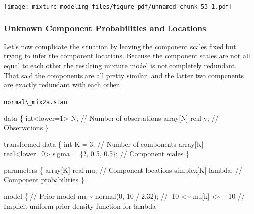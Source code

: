 \documentclass[
  letterpaper,
  DIV=11,
  numbers=noendperiod]{scrartcl}
\newenvironment{Shaded}{\begin{snugshade}}{\end{snugshade}}
\newcommand{\CommentTok}[1]{\textcolor[rgb]{0.37,0.37,0.37}{#1}}
\newcommand{\DataTypeTok}[1]{\textcolor[rgb]{0.68,0.00,0.00}{#1}}
\newcommand{\DecValTok}[1]{\textcolor[rgb]{0.68,0.00,0.00}{#1}}
\newcommand{\FloatTok}[1]{\textcolor[rgb]{0.68,0.00,0.00}{#1}}
\newcommand{\KeywordTok}[1]{\textcolor[rgb]{0.00,0.23,0.31}{#1}}
\newcommand{\NormalTok}[1]{\textcolor[rgb]{0.00,0.23,0.31}{#1}}
\begin{document}
\texttt{[image: mixture\_modeling\_files/figure-pdf/unnamed-chunk-53-1.pdf]}

\subsubsection{Unknown Component Probabilities and
Locations}\label{unknown-component-probabilities-and-locations}

Let's now complicate the situation by leaving the component scales fixed
but trying to infer the component locations. Because the component
scales are not all equal to each other the resulting mixture model is
not completely redundant. That said the components are all pretty
similar, and the latter two components are exactly redundant with each
other.

\begin{codelisting}

\caption{\texttt{normal\textbackslash\_mix2a.stan}}

\begin{Shaded}
\begin{Highlighting}[]
\KeywordTok{data}\NormalTok{ \{}
  \DataTypeTok{int}\NormalTok{\textless{}}\KeywordTok{lower}\NormalTok{=}\DecValTok{1}\NormalTok{\textgreater{} N;  }\CommentTok{// Number of observations}
  \DataTypeTok{array}\NormalTok{[N] }\DataTypeTok{real}\NormalTok{ y; }\CommentTok{// Observations}
\NormalTok{\}}

\KeywordTok{transformed data}\NormalTok{ \{}
  \DataTypeTok{int}\NormalTok{ K = }\DecValTok{3}\NormalTok{;                                    }\CommentTok{// Number of components}
  \DataTypeTok{array}\NormalTok{[K] }\DataTypeTok{real}\NormalTok{\textless{}}\KeywordTok{lower}\NormalTok{=}\DecValTok{0}\NormalTok{\textgreater{} sigma = \{}\DecValTok{2}\NormalTok{, }\FloatTok{0.5}\NormalTok{, }\FloatTok{0.5}\NormalTok{\}; }\CommentTok{// Component scales}
\NormalTok{\}}

\KeywordTok{parameters}\NormalTok{ \{}
  \DataTypeTok{array}\NormalTok{[K] }\DataTypeTok{real}\NormalTok{ mu;  }\CommentTok{// Component locations}
  \DataTypeTok{simplex}\NormalTok{[K] lambda; }\CommentTok{// Component probabilities}
\NormalTok{\}}

\KeywordTok{model}\NormalTok{ \{}
  \CommentTok{// Prior model}
\NormalTok{  mu \textasciitilde{} normal(}\DecValTok{0}\NormalTok{, }\DecValTok{10}\NormalTok{ / }\FloatTok{2.32}\NormalTok{); }\CommentTok{// {-}10 \textless{}\textasciitilde{} mu[k] \textless{}\textasciitilde{} +10}
  \CommentTok{// Implicit uniform prior density function for lambda}


\end{Highlighting}
\end{Shaded}
\end{codelisting}
\end{document}
